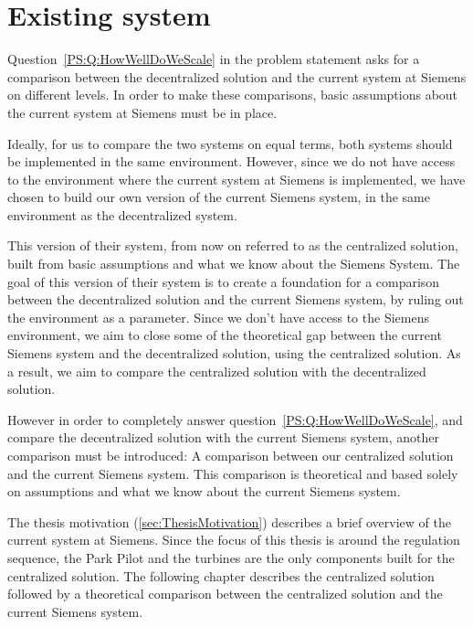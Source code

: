 \chapter{Existing system}\label{cha:existingSystem}

Question~\ref{PS:Q:HowWellDoWeScale} in the problem statement asks for a comparison between the decentralized solution and the current system at Siemens on different levels. In order to make these comparisons, basic assumptions about the current system at Siemens must be in place. 

Ideally, for us to compare the two systems on equal terms, both systems should be implemented in the same environment. However, since we do not have access to the environment where the current system at Siemens is implemented, we have chosen to build our own version of the current Siemens system, in the same environment as the decentralized system.

This version of their system, from now on referred to as the centralized solution, built from basic assumptions and what we know about the Siemens System. The goal of this version of their system is to create a foundation for a comparison between the decentralized solution and the current Siemens system, by ruling out the environment as a parameter. Since we don't have access to the Siemens environment, we aim to close some of the theoretical gap between the current Siemens system and the decentralized solution, using the centralized solution. As a result, we aim to compare the centralized solution with the decentralized solution.

However in order to completely answer question~\ref{PS:Q:HowWellDoWeScale}, and compare the decentralized solution with the current Siemens system, another comparison must be introduced: A comparison between our centralized solution and the current Siemens system. This comparison is theoretical and based solely on assumptions and what we know about the current Siemens system. 

The thesis motivation (\cref{sec:ThesisMotivation}) describes a brief overview of the current system at Siemens. Since the focus of this thesis is around the regulation sequence, the Park Pilot and the turbines are the only components built for the centralized solution. The following chapter describes the centralized solution followed by a theoretical comparison between the centralized solution and the current Siemens system. 


